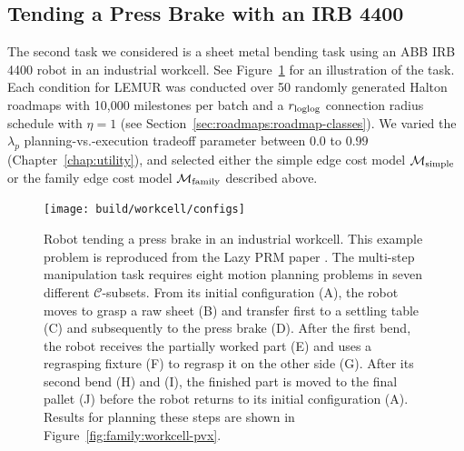 
\subsection{Tending a Press Brake with an IRB 4400}

The second task we considered is a sheet metal bending task
using an ABB IRB 4400 robot in an industrial workcell.
See Figure~\ref{fig:family:workcell-configs}
for an illustration of the task.
Each condition for LEMUR was conducted over 50 randomly generated
Halton roadmaps with 10,000 milestones per batch
and a $r_{\mbox{\scriptsize loglog}}$ connection radius schedule with $\eta = 1$
(see Section~\ref{sec:roadmaps:roadmap-classes}).
We varied the $\lambda_p$ planning-vs.-execution tradeoff parameter
between $0.0$ to $0.99$ (Chapter~\ref{chap:utility}),
and selected either
the simple edge cost model $\mathcal{M}_{\mbox{\scriptsize simple}}$
or the family edge cost model $\mathcal{M}_{\mbox{\scriptsize family}}$
described above.

\begin{figure}
   \centering
   \texttt{[image: build/workcell/configs]}
   \caption{Robot tending a press brake in an industrial workcell.
      This example problem is reproduced from the Lazy PRM paper
      \citep{bohlin2000lazyprm}.
      The multi-step manipulation task requires eight motion planning
      problems in seven different $\mathcal{C}$-subsets.
      From its initial configuration (A),
      the robot moves to grasp a raw sheet (B)
      and transfer first to a settling table (C)
      and subsequently to the press brake (D).
      After the first bend, the robot receives the partially worked
      part (E) and uses a regrasping fixture (F)
      to regrasp it on the other side (G).
      After its second bend (H) and (I),
      the finished part is moved to the final pallet (J)
      before the robot returns to its initial configuration (A).
      Results for planning these steps are shown in
      Figure~\ref{fig:family:workcell-pvx}.}
   \label{fig:family:workcell-configs}
\end{figure}

